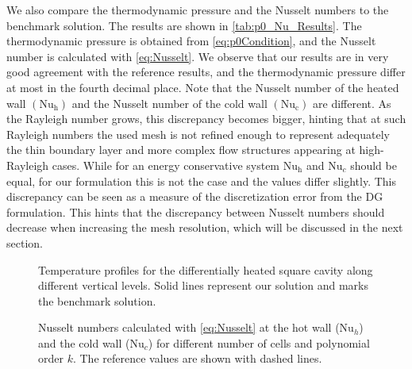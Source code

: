 We also compare the thermodynamic pressure and the Nusselt numbers to the benchmark solution. The results are shown in \cref{tab:p0_Nu_Results}. The thermodynamic pressure is obtained from \cref{eq:p0Condition}, and the Nusselt number is calculated with \cref{eq:Nusselt}. We observe that our results are in very good agreement with the reference results, and the thermodynamic pressure differ at most in the fourth decimal place. Note that the Nusselt number of the heated  wall $(\text{Nu}_\text{h})$ and the Nusselt number of the cold wall $(\text{Nu}_\text{c})$ are different.  As the Rayleigh number grows, this discrepancy becomes bigger, hinting that at such Rayleigh numbers the used mesh is not refined enough  to represent adequately the thin boundary layer and more complex flow structures appearing at high-Rayleigh cases. While for an energy conservative system $\text{Nu}_\text{h}$ and $\text{Nu}_c$ should be equal, for our formulation this is not the case and the values differ slightly. This discrepancy can be seen as a measure of the discretization error from the DG formulation.\cite{kleinHighorderDiscontinuousGalerkin2016} This hints that the discrepancy between Nusselt numbers should decrease when increasing the mesh resolution, which will be discussed in the next section. 

\begin{figure}[b!]
	\centering
	\pgfplotsset{width=0.20\textwidth, compat=1.3}
	\caption{Temperature profiles for the differentially heated square cavity along different vertical levels. Solid lines represent our solution and marks the benchmark solution. \cite{vierendeelsBenchmarkSolutionsNatural2003}}
	\label{fig:TempProfile}
\end{figure}

\begin{figure}[b!]
	\centering
	\caption{Nusselt numbers calculated with \cref{eq:Nusselt} at the hot wall ($\text{Nu}_h$) and the cold wall ($\text{Nu}_c$) for different number of cells and polynomial order $k$. The reference values\cite{vierendeelsBenchmarkSolutionsNatural2003} are shown with dashed lines.}\label{fig:NusseltStudy}
\end{figure}

